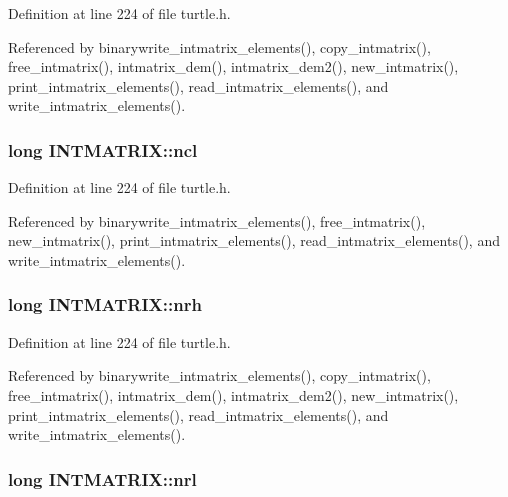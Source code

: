 Definition at line 224 of file turtle.\-h.



Referenced by binarywrite\-\_\-intmatrix\-\_\-elements(), copy\-\_\-intmatrix(), free\-\_\-intmatrix(), intmatrix\-\_\-dem(), intmatrix\-\_\-dem2(), new\-\_\-intmatrix(), print\-\_\-intmatrix\-\_\-elements(), read\-\_\-intmatrix\-\_\-elements(), and write\-\_\-intmatrix\-\_\-elements().

\hypertarget{struct_i_n_t_m_a_t_r_i_x_a6aeab0238a62dd0f7ca4a9d883d71da5}{
\subsubsection[{ncl}]{\setlength{\rightskip}{0pt plus 5cm}long I\-N\-T\-M\-A\-T\-R\-I\-X\-::ncl}}\label{struct_i_n_t_m_a_t_r_i_x_a6aeab0238a62dd0f7ca4a9d883d71da5}


Definition at line 224 of file turtle.\-h.



Referenced by binarywrite\-\_\-intmatrix\-\_\-elements(), free\-\_\-intmatrix(), new\-\_\-intmatrix(), print\-\_\-intmatrix\-\_\-elements(), read\-\_\-intmatrix\-\_\-elements(), and write\-\_\-intmatrix\-\_\-elements().

\hypertarget{struct_i_n_t_m_a_t_r_i_x_a41cb525037b6cc968939a441b36fcbde}{
\subsubsection[{nrh}]{\setlength{\rightskip}{0pt plus 5cm}long I\-N\-T\-M\-A\-T\-R\-I\-X\-::nrh}}\label{struct_i_n_t_m_a_t_r_i_x_a41cb525037b6cc968939a441b36fcbde}


Definition at line 224 of file turtle.\-h.



Referenced by binarywrite\-\_\-intmatrix\-\_\-elements(), copy\-\_\-intmatrix(), free\-\_\-intmatrix(), intmatrix\-\_\-dem(), intmatrix\-\_\-dem2(), new\-\_\-intmatrix(), print\-\_\-intmatrix\-\_\-elements(), read\-\_\-intmatrix\-\_\-elements(), and write\-\_\-intmatrix\-\_\-elements().

\hypertarget{struct_i_n_t_m_a_t_r_i_x_a51a4582cb062b29575f2fad7f741650a}{
\subsubsection[{nrl}]{\setlength{\rightskip}{0pt plus 5cm}long I\-N\-T\-M\-A\-T\-R\-I\-X\-::nrl}}\label{struct_i_n_t_m_a_t_r_i_x_a51a4582cb062b29575f2fad7f741650a}


